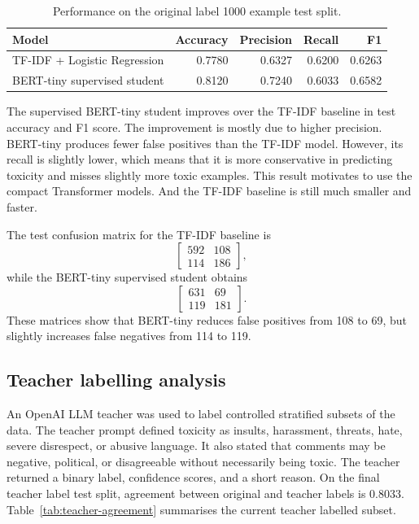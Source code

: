 \documentclass[pdflatex,sn-mathphys-num]{sn-jnl}
\begin{document}
\begin{table}[h]
\caption{Performance on the original label 1000 example test split.}\label{tab:original-baselines}
\centering
\begin{tabular}{lrrrr}
\toprule
Model & Accuracy & Precision & Recall & F1 \\
\midrule
TF-IDF + Logistic Regression & 0.7780 & 0.6327 & 0.6200 & 0.6263 \\
BERT-tiny supervised student & 0.8120 & 0.7240 & 0.6033 & 0.6582 \\
\bottomrule
\end{tabular}
\end{table}

The supervised BERT-tiny student improves over the TF-IDF baseline in test accuracy and F1 score.
The improvement is mostly due to higher precision.
BERT-tiny produces fewer false positives than the TF-IDF model.
However, its recall is slightly lower, which means that it is more conservative in predicting toxicity and misses slightly more toxic examples.
This result motivates to use the compact Transformer models. And the TF-IDF baseline is still much smaller and faster.

The test confusion matrix for the TF-IDF baseline is
\begin{equation}
\begin{bmatrix}
592 & 108 \\
114 & 186
\end{bmatrix},
\end{equation}
while the BERT-tiny supervised student obtains
\begin{equation}
\begin{bmatrix}
631 & 69 \\
119 & 181
\end{bmatrix}.
\end{equation}
These matrices show that BERT-tiny reduces false positives from 108 to 69, but slightly increases false negatives from 114 to 119.

\subsection{Teacher labelling analysis}

An OpenAI LLM teacher was used to label controlled stratified subsets of the data.
The teacher prompt defined toxicity as insults, harassment, threats, hate, severe disrespect, or abusive language.
It also stated that comments may be negative, political, or disagreeable without necessarily being toxic.
The teacher returned a binary label, confidence scores, and a short reason.
On the final teacher label test split, agreement between original and teacher labels is 0.8033.
Table~\ref{tab:teacher-agreement} summarises the current teacher labelled subset.
\end{document}
